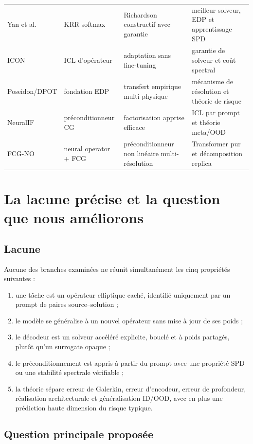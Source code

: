 \documentclass[11pt,a4paper]{article}
\begin{document}
\begin{longtable}{p{}p{}p{}p{}}
Yan et al. \cite{yan2026richardson} & KRR softmax & Richardson constructif avec
garantie & meilleur solveur, EDP et apprentissage SPD \\
ICON \cite{yang2023icon} & ICL d'opérateur & adaptation sans fine-tuning &
garantie de solveur et coût spectral \\
Poseidon/DPOT \cite{herde2024poseidon,hao2024dpot} & fondation EDP & transfert
empirique multi-physique & mécanisme de résolution et théorie de risque \\
NeuralIF \cite{hausner2023neuralif} & préconditionneur CG & factorisation
apprise efficace & ICL par prompt et théorie meta/OOD \\
FCG-NO \cite{rudikov2024fcgno} & neural operator + FCG & préconditionneur non
linéaire multi-résolution & Transformer pur et décomposition replica \\
\bottomrule
\end{longtable}

\section{La lacune précise et la question que nous améliorons}

\subsection{Lacune}

Aucune des branches examinées ne réunit simultanément les cinq propriétés
suivantes :
\begin{enumerate}[leftmargin=*]
  \item une tâche est un opérateur elliptique caché, identifié uniquement par
  un prompt de paires source--solution ;
  \item le modèle se généralise à un nouvel opérateur sans mise à jour de ses
  poids ;
  \item le décodeur est un solveur accéléré explicite, bouclé et à poids
  partagés, plutôt qu'un surrogate opaque ;
  \item le préconditionnement est appris à partir du prompt avec une propriété
  SPD ou une stabilité spectrale vérifiable ;
  \item la théorie sépare erreur de Galerkin, erreur d'encodeur, erreur de
  profondeur, réalisation architecturale et généralisation ID/OOD, avec en
  plus une prédiction haute dimension du risque typique.
\end{enumerate}

\subsection{Question principale proposée}
\end{document}
